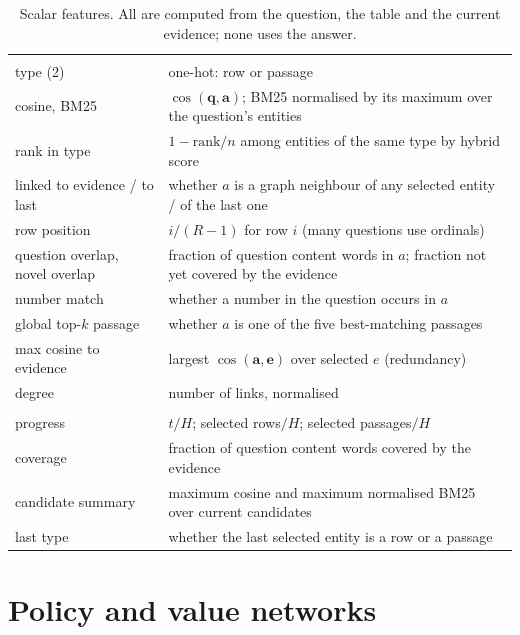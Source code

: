\begin{table}[ht]
\centering
\small
\caption{Scalar features. All are computed from the question, the table and the current evidence; none uses the answer.}
\label{tab:features}
\begin{tabularx}{\textwidth}{@{}>{\raggedright\arraybackslash}p{4.1cm}X@{}}
\toprule
\multicolumn{2}{@{}l}{\textit{Candidate features (14)}} \\
type (2) & one-hot: row or passage \\
cosine, BM25 & $\cos(\mathbf{q},\mathbf{a})$; BM25 normalised by its maximum over the question's entities \\
rank in type & $1-\text{rank}/n$ among entities of the same type by hybrid score \\
linked to evidence / to last & whether $a$ is a graph neighbour of any selected entity / of the last one \\
row position & $i/(R-1)$ for row $i$ (many questions use ordinals) \\
question overlap, novel overlap & fraction of question content words in $a$; fraction not yet covered by the evidence \\
number match & whether a number in the question occurs in $a$ \\
global top-$k$ passage & whether $a$ is one of the five best-matching passages \\
max cosine to evidence & largest $\cos(\mathbf{a},\mathbf{e})$ over selected $e$ (redundancy) \\
degree & number of links, normalised \\
\midrule
\multicolumn{2}{@{}l}{\textit{State scalars (8)}} \\
progress & $t/H$; selected rows$/H$; selected passages$/H$ \\
coverage & fraction of question content words covered by the evidence \\
candidate summary & maximum cosine and maximum normalised BM25 over current candidates \\
last type & whether the last selected entity is a row or a passage \\
\bottomrule
\end{tabularx}
\end{table}

\section{Policy and value networks}
\label{sec:arch}

